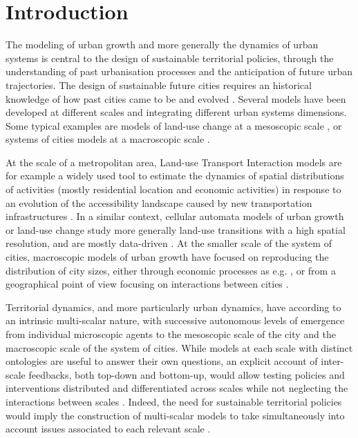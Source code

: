 \documentclass[ijgi,article,submit,moreauthors,pdftex]{Definitions/mdpi}
\begin{document}




\section{Introduction}

The modeling of urban growth and more generally the dynamics of urban systems is central to the design of sustainable territorial policies, through the understanding of past urbanisation processes and the anticipation of future urban trajectories. The design of sustainable future cities requires an historical knowledge of how past cities came to be and evolved \cite{batty2018inventing}. Several models have been developed at different scales and integrating different urban systems dimensions. Some typical examples are models of land-use change at a mesoscopic scale \cite{iacono2008models}, or systems of cities models at a macroscopic scale \cite{pumain2017urban}.

At the scale of a metropolitan area, Land-use Transport Interaction models \cite{wegener2004land} are for example a widely used tool to estimate the dynamics of spatial distributions of activities (mostly residential location and economic activities) in response to an evolution of the accessibility landscape caused by new transportation infrastructures \cite{raimbault:halshs-02265423}. In a similar context, cellular automata models of urban growth or land-use change study more generally land-use transitions with a high spatial resolution, and are mostly data-driven \cite{clarke2007decade}. At the smaller scale of the system of cities, macroscopic models of urban growth have focused on reproducing the distribution of city sizes, either through economic processes as e.g. \cite{gabaix1999zipf}, or from a geographical point of view focusing on interactions between cities \cite{favaro2011gibrat}.

Territorial dynamics, and more particularly urban dynamics, have according to \cite{pumain1997pour} an intrinsic multi-scalar nature, with successive autonomous levels of emergence from individual microscopic agents to the mesoscopic scale of the city and the macroscopic scale of the system of cities. While models at each scale with distinct ontologies are useful to answer their own questions, an explicit account of inter-scale feedbacks, both top-down and bottom-up, would allow testing policies and interventions distributed and differentiated across scales while not neglecting the interactions between scales \cite{wegener2018multi}. Indeed, the need for sustainable territorial policies would imply the construction of multi-scalar models to take simultaneously into account issues associated to each relevant scale \cite{Rozenblat2018,raimbault:halshs-02284933}.
\end{document}
